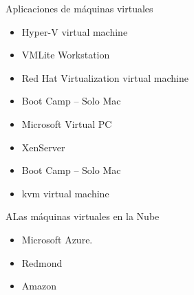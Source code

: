 \documentclass[%
 reprint,
 amsmath,amssymb,
 aps,
]{revtex4-1}
\begin{document}
\par Aplicaciones de máquinas virtuales 
	\begin{itemize}
		\item Hyper-V virtual machine
		\item VMLite Workstation
		\item Red Hat Virtualization virtual machine
		\item Boot Camp – Solo Mac 
                     \item Microsoft Virtual PC
		\item XenServer
		\item Boot Camp – Solo Mac		
		\item kvm virtual machine\cite{campus}
	\end{itemize}
\par ALas máquinas virtuales  en la Nube
	\begin{itemize}
		\item Microsoft Azure.
		\item  Redmond
		\item Amazon
	\end{itemize}
\end{document}
